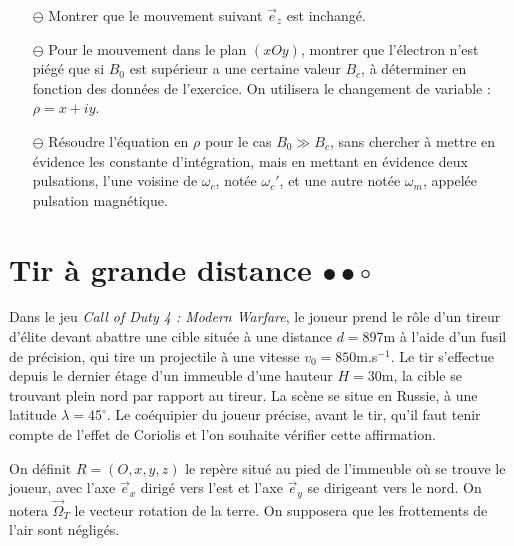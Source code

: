 \documentclass{report}
\begin{document}
\begin{itemize}

		\item[$\ominus$] Montrer que le mouvement suivant $\vec{e}_z$ est inchangé.
		
		\item[$\ominus$] Pour le mouvement dans le plan $(xOy)$, montrer que l'électron n'est piégé que si $B_0$ est supérieur a une certaine valeur $B_c$, à déterminer en fonction des données de l'exercice. On utilisera le changement de variable : $\rho = x+iy$.
		
		\item[$\ominus$] Résoudre l'équation en $\rho$ pour le cas $B_0\gg B_c$, sans chercher à mettre en évidence les constante d'intégration, mais en mettant en évidence deux pulsations, l'une voisine de $\omega_c$, notée $\omega_c'$, et une autre notée $\omega_m$, appelée pulsation magnétique. 
		
\end{itemize}

\newpage

\section*{Tir à grande distance $\bullet\bullet\circ$}

Dans le jeu \textit{Call of Duty 4 : Modern Warfare}, le joueur prend le rôle d'un tireur d'élite devant abattre une cible située à une distance $d=$897m à l'aide d'un fusil de précision, qui tire un projectile à une vitesse $v_0=850$m.s$^{-1}$. Le tir s'effectue depuis le dernier étage d'un immeuble d'une hauteur $H=30$m, la cible se trouvant plein nord par rapport au tireur. La scène se situe en Russie, à une latitude $\lambda=45^\circ$. Le coéquipier du joueur précise, avant le tir, qu'il faut tenir compte de l'effet de Coriolis et l'on souhaite vérifier cette affirmation.

On définit $R=(O,x,y,z)$ le repère situé au pied de l'immeuble où se trouve le joueur, avec l'axe $\vec{e}_x$ dirigé vers l'est et l'axe $\vec{e}_y$ se dirigeant vers le nord. On notera $\vec{\Omega}_T$ le vecteur rotation de la terre. On supposera que les frottements de l'air sont négligés.
\end{document}
